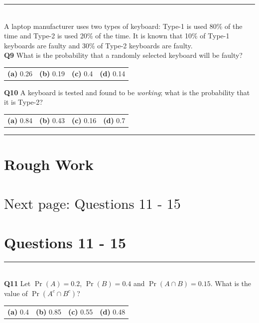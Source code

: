 \documentclass[12pt]{article}
\begin{document}
\rule{\linewidth}{1pt}
\quad\\
A laptop manufacturer uses two types of keyboard: Type-1 is used 80\% of the time and Type-2 is used 20\% of the time. It is known that 10\% of Type-1 keyboards are faulty and 30\% of Type-2 keyboards are faulty.\\[0.3cm]


{\bf Q9} What is the probability that a randomly selected keyboard will be faulty?\\[0.2cm]
\begin{tabular}{cccc}
{\bf(a)} 0.26 & {\bf(b)} 0.19 & {\bf(c)} 0.4 & {\bf(d)} 0.14 \\[0.6cm]
\end{tabular}

{\bf Q10} A keyboard is tested and found to be \emph{working}; what is the probability that it is Type-2?\\[0.2cm]
\begin{tabular}{cccc}
{\bf(a)} 0.84 & {\bf(b)} 0.43 & {\bf(c)} 0.16 & {\bf(d)} 0.7 \\[0.6cm]
\end{tabular}


\rule{\linewidth}{1pt}

\newpage

\section*{Rough Work\\[23cm]}
\section*{\hspace{8cm}$\boxed{\text{Next page: Questions 11 - 15}}$}

\newpage

\section*{Questions 11 - 15}


\rule{\linewidth}{1pt}
\quad\\
{\bf Q11} Let $\Pr(A) = 0.2$, $\Pr(B) = 0.4$ and $\Pr(A \cap B) = 0.15$. What is the value of $\Pr(A^c \cap B^c)$? \\[0.2cm]
\begin{tabular}{cccc}
{\bf(a)} 0.4 & {\bf(b)} 0.85  & {\bf(c)} 0.55  & {\bf(d)} 0.48 \\[0.6cm]
\end{tabular}
\end{document}
